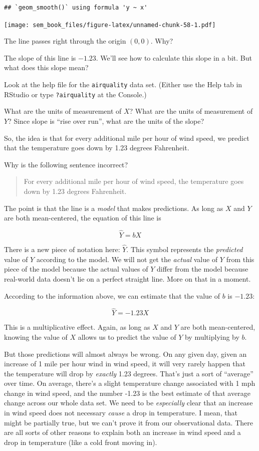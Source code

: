 \documentclass[
]{book}
\begin{document}
\begin{verbatim}
## `geom_smooth()` using formula 'y ~ x'
\end{verbatim}

\texttt{[image: sem\_book\_files/figure-latex/unnamed-chunk-58-1.pdf]}

The line passes right through the origin \((0, 0)\). Why?

The slope of this line is \(-1.23\). We'll see how to calculate this slope in a bit. But what does this slope mean?

Look at the help file for the \texttt{airquality} data set. (Either use the Help tab in RStudio or type \texttt{?airquality} at the Console.)

What are the units of measurement of \(X\)? What are the units of measurement of \(Y\)? Since slope is ``rise over run'', what are the units of the slope?

So, the idea is that for every additional mile per hour of wind speed, we predict that the temperature goes down by 1.23 degrees Fahrenheit.

Why is the following sentence incorrect?

\begin{quote}
For every additional mile per hour of wind speed, the temperature goes down by 1.23 degrees Fahrenheit.
\end{quote}

The point is that the line is a \emph{model} that makes predictions. As long as \(X\) and \(Y\) are both mean-centered, the equation of this line is

\[
\hat{Y} = bX
\]

There is a new piece of notation here: \(\hat{Y}\). This symbol represents the \emph{predicted} value of \(Y\) according to the model. We will not get the \emph{actual} value of \(Y\) from this piece of the model because the actual values of \(Y\) differ from the model because real-world data doesn't lie on a perfect straight line. More on that in a moment.

According to the information above, we can estimate that the value of \(b\) is \(-1.23\):

\[
\hat{Y} = -1.23X
\]

This is a multiplicative effect. Again, as long as \(X\) and \(Y\) are both mean-centered, knowing the value of \(X\) allows us to predict the value of \(Y\) by multiplying by \(b\).

But those predictions will almost always be wrong. On any given day, given an increase of 1 mile per hour wind in wind speed, it will very rarely happen that the temperature will drop by \emph{exactly} 1.23 degrees. That's just a sort of ``average'' over time. On average, there's a slight temperature change associated with 1 mph change in wind speed, and the number -1.23 is the best estimate of that average change across our whole data set. We need to be \emph{especially} clear that an increase in wind speed does not necessary \emph{cause} a drop in temperature. I mean, that might be partially true, but we can't prove it from our observational data. There are all sorts of other reasons to explain both an increase in wind speed and a drop in temperature (like a cold front moving in).
\end{document}
